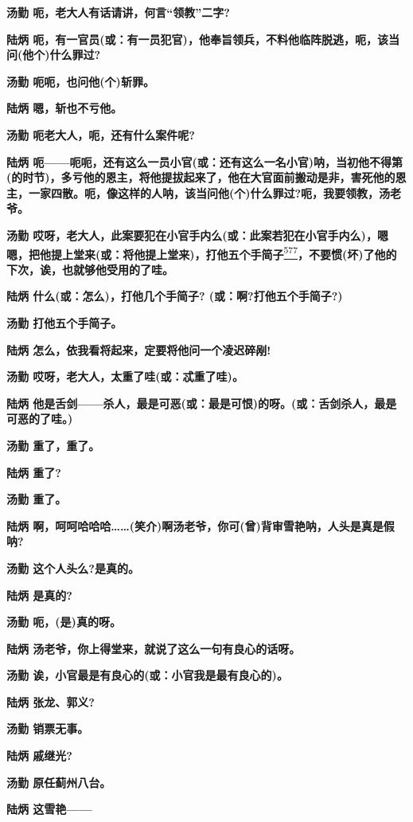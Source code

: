 \textbf{汤勤 呃，老大人有话请讲，何言``领教''二字?}

\textbf{陆炳
呃，有一官员(或：有一员犯官)，他奉旨领兵，不料他临阵脱逃，呃，该当问(他个)什么罪过?}

\textbf{汤勤 呃呃，也问他(个)斩罪。}

\textbf{陆炳 嗯，斩也不亏他。}

\textbf{汤勤 呃老大人，呃，还有什么案件呢?}

\textbf{陆炳
呃------呃呃，还有这么一员小官(或：还有这么一名小官)呐，当初他不得第(的时节)，多亏他的恩主，将他提拔起来了，他在大官面前搬动是非，害死他的恩主，一家四散。呃，像这样的人呐，该当问他(个)什么罪过?呃，我要领教，汤老爷。}

\textbf{汤勤
哎呀，老大人，此案要犯在小官手内么(或：此案若犯在小官手内么)，嗯嗯，把他提上堂来(或：将他提上堂来)，打他五个手简子}\protect\hyperlink{fn577}{\textsuperscript{577}}\textbf{，不要惯(坏)了他的下次，诶，也就够他受用的了哇。}

\textbf{陆炳 什么(或：怎么)，打他几个手简子? (或：啊?打他五个手简子?)}

\textbf{汤勤 打他五个手简子。}

\textbf{陆炳 怎么，依我看将起来，定要将他问一个凌迟碎剐!}

\textbf{汤勤 哎呀，老大人，太重了哇(或：忒重了哇)。}

\textbf{陆炳
他是舌剑------杀人，最是可恶(或：最是可恨)的呀。(或：舌剑杀人，最是可恶的了哇。)}

\textbf{汤勤 重了，重了。}

\textbf{陆炳 重了?}

\textbf{汤勤 重了。}

\textbf{陆炳
啊，呵呵哈哈哈\ldots{}\ldots{}(笑介)啊汤老爷，你可(曾)背审雪艳呐，人头是真是假呐?}

\textbf{汤勤 这个人头么?是真的。}

\textbf{陆炳 是真的?}

\textbf{汤勤 呃，(是)真的呀。}

\textbf{陆炳 汤老爷，你上得堂来，就说了这么一句有良心的话呀。}

\textbf{汤勤 诶，小官最是有良心的(或：小官我是最有良心的)。}

\textbf{陆炳 张龙、郭义?}

\textbf{汤勤 销票无事。}

\textbf{陆炳 戚继光?}

\textbf{汤勤 原任蓟州八台。}

\textbf{陆炳 这雪艳------}

